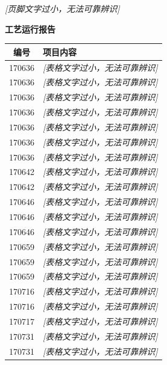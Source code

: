 \documentclass[UTF8,10pt,a4paper,fontset=fandol]{ctexart}
\begin{document}
\begin{center}
\begin{minipage}[t]{0.47\textwidth}
\vspace{2mm}
\textit{[页脚文字过小，无法可靠辨识]}
\end{minipage}

\vspace{8mm}

\begin{minipage}[t]{0.47\textwidth}
\centering
\textbf{工艺运行报告}

\small
\begin{tabularx}{\textwidth}{|c|X|}
\hline
\textbf{编号} & \textbf{项目内容} \\ \hline
170636 & \textit{[表格文字过小，无法可靠辨识]} \\ \hline
170636 & \textit{[表格文字过小，无法可靠辨识]} \\ \hline
170636 & \textit{[表格文字过小，无法可靠辨识]} \\ \hline
170636 & \textit{[表格文字过小，无法可靠辨识]} \\ \hline
170636 & \textit{[表格文字过小，无法可靠辨识]} \\ \hline
170636 & \textit{[表格文字过小，无法可靠辨识]} \\ \hline
170636 & \textit{[表格文字过小，无法可靠辨识]} \\ \hline
170642 & \textit{[表格文字过小，无法可靠辨识]} \\ \hline
170642 & \textit{[表格文字过小，无法可靠辨识]} \\ \hline
170646 & \textit{[表格文字过小，无法可靠辨识]} \\ \hline
170646 & \textit{[表格文字过小，无法可靠辨识]} \\ \hline
170646 & \textit{[表格文字过小，无法可靠辨识]} \\ \hline
170659 & \textit{[表格文字过小，无法可靠辨识]} \\ \hline
170659 & \textit{[表格文字过小，无法可靠辨识]} \\ \hline
170659 & \textit{[表格文字过小，无法可靠辨识]} \\ \hline
170716 & \textit{[表格文字过小，无法可靠辨识]} \\ \hline
170716 & \textit{[表格文字过小，无法可靠辨识]} \\ \hline
170717 & \textit{[表格文字过小，无法可靠辨识]} \\ \hline
170731 & \textit{[表格文字过小，无法可靠辨识]} \\ \hline
170731 & \textit{[表格文字过小，无法可靠辨识]} \\ \hline
\end{tabularx}


\end{minipage}
\end{center}
\end{document}
